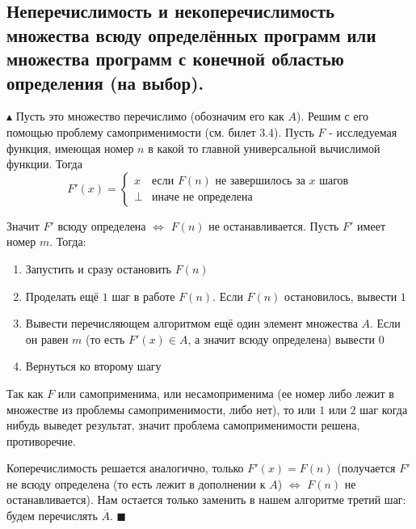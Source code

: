 \subsection{Неперечислимость и некоперечислимость множества всюду определённых программ или множества программ с конечной областью определения (на выбор).}
\par$\blacktriangle$ Пусть это множество перечислимо (обозначим его как $A$). Решим с его помощью проблему самоприменимости (см. билет 3.4). Пусть $F$ - исследуемая функция, имеющая номер $n$ в какой то главной универсальной вычислимой функции. 
Тогда $$F'(x) = \begin{cases} 
x & \text{если $F(n)$ не завершилось за $x$ шагов}\\
\bot & \text{иначе не определена}
\end{cases}$$
\par Значит $F'$ всюду определена $\Leftrightarrow$ $F(n)$ не останавливается.
Пусть $F'$ имеет номер $m$. Тогда: \begin{enumerate}
    \item Запустить и сразу остановить $F(n)$
    \item Проделать ещё $1$ шаг в работе $F(n)$. Если $F(n)$ остановилось, вывести $1$
    \item Вывести перечисляющем алгоритмом ещё один элемент множества $A$. Если он равен $m$ (то есть $F'(x) \in A$, а значит всюду определена) вывести $0$
    \item Вернуться ко второму шагу
\end{enumerate}
Так как $F$ или самоприменима, или несамоприменима (ее номер либо лежит в множестве из проблемы самоприменимости, либо нет), то или $1$ или $2$ шаг когда нибудь выведет результат, значит проблема самоприменимости решена, противоречие.
\par Коперечислимость решается аналогично, только $F'(x) = F(n)$ (получается $F'$ не всюду определена (то есть лежит в дополнении к $A$) $\Leftrightarrow$ $F(n)$ не останавливается). Нам остается только заменить в нашем алгоритме третий шаг: будем перечислять $\overline{A}$. $\blacksquare$


